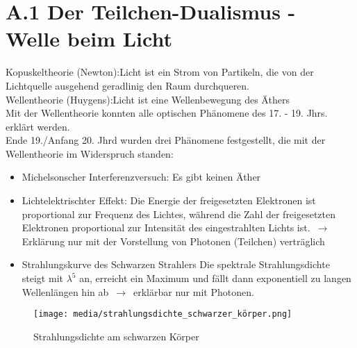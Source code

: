 \section{A.1 Der Teilchen-Dualismus - Welle beim Licht}

Kopuskeltheorie (Newton):\quad Licht ist ein Strom von Partikeln, die von der Lichtquelle ausgehend geradlinig den Raum durchqueren.\\

Wellentheorie (Huygens):\quad Licht ist eine Wellenbewegung des Äthers\\

Mit der Wellentheorie konnten alle optischen Phänomene des 17. - 19. Jhrs. erklärt werden.\\


Ende 19./Anfang 20. Jhrd wurden drei Phänomene festgestellt, die mit der Wellentheorie im Widerspruch standen:
\begin{itemize}
    \item Michelsonscher Interferenzversuch: Es gibt keinen Äther
    \item Lichtelektrischter Effekt:
        \subitem Die Energie der freigesetzten Elektronen ist proportional zur Frequenz des Lichtes, während die Zahl der freigesetzten Elektronen proportional zur Intensität des eingestrahlten Lichts ist.
        \subitem $\,\to\,$ Erklärung nur mit der Vorstellung von Photonen (Teilchen) verträglich

    \newpage
    \item Strahlungskurve des Schwarzen Strahlers
        \subitem Die spektrale Strahlungsdichte steigt mit $\lambda^5$ an, erreicht ein Maximum und fällt dann exponentiell zu langen Wellenlängen hin ab $\,\to\,$ erklärbar nur mit Photonen.
\end{itemize}

\begin{figure}[h]
    \centering
    \texttt{[image: media/strahlungsdichte\_schwarzer\_körper.png]}
    \caption{Strahlungsdichte am schwarzen Körper}
    \label{fig:meine-grafik}
   \end{figure}